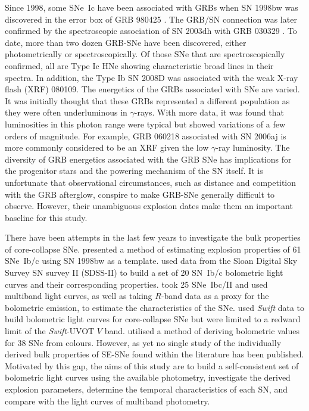 \documentclass[a4paper,fleqn,usenatbib]{mnras}
\begin{document}
Since 1998, some SNe~Ic have been associated with GRBs when SN 1998bw was discovered in the error box of GRB 980425 \citep{Galama1998}. The GRB/SN connection was later confirmed by the spectroscopic association of SN 2003dh with GRB 030329 \citep[e.g.,][]{Matheson2003,Hjorth2003}. To date, more than two dozen GRB-SNe have been discovered, either photometrically or spectroscopically. Of those SNe that are spectroscopically confirmed, all are Type Ic HNe showing characteristic broad lines in their spectra. 
In addition, the Type Ib SN 2008D \citep{Mazzali2008,Soderberg2008} was associated with the weak X-ray flash (XRF) 080109. The energetics of the GRBs associated with SNe are varied. It was initially thought that these GRBs represented a different population as they were often underluminous in $\gamma$-rays. With more data, it was found that luminosities in this photon range were typical but showed variations of a few orders of magnitude. For example, GRB 060218 associated with SN 2006aj is more commonly considered to be an XRF given the low $\gamma$-ray luminosity. The diversity of GRB energetics associated with the GRB SNe has implications for the progenitor stars and the powering mechanism of the SN itself. It is unfortunate that observational circumstances, such as distance and competition with the GRB afterglow, conspire to make GRB-SNe generally difficult to observe. However, their unambiguous explosion dates make them an important baseline for this study.

There have been attempts in the last few years to investigate the bulk properties of core-collapse SNe. \cite{Cano2013} presented a method of estimating explosion properties of 61 SNe~Ib/c using SN 1998bw as a template. \cite{Taddia2015} used data from the Sloan Digital Sky Survey SN survey II (SDSS-II) to build a set of 20 SN~Ib/c bolometric light curves and their corresponding properties. \cite{Drout2011} took 25 SNe~Ibc/II and used multiband light curves, as well as taking $R$-band data as a proxy for the bolometric emission, to estimate the characteristics of the SNe. \cite{Pritchard2014} used \textit{Swift} data to build bolometric light curves for core-collapse SNe but were limited to a redward limit of the \textit{Swift}-UVOT $V$ band. \cite{Lyman2014b} utilised a method of deriving bolometric values for 38 SNe from colours. However, as yet no single study of the individually derived bulk properties of SE-SNe found within the literature has been published. Motivated by this gap, the aims of this study are to build a self-consistent set of bolometric light curves using the available photometry, investigate the derived explosion parameters, determine the temporal characteristics of each SN, and compare with the light curves of multiband photometry.
\end{document}
